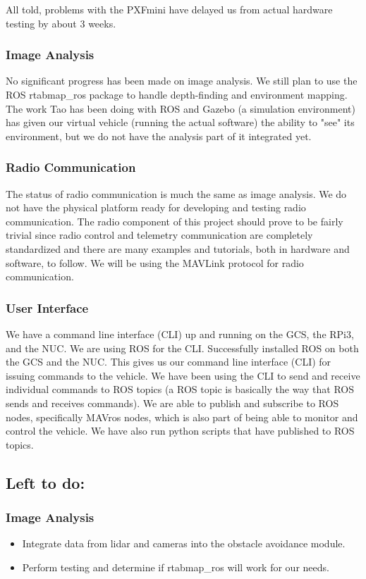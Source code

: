 \documentclass[compsoc,draftclsnofoot,onecolumn,10pt]{IEEEtran}
\begin{document}
All told, problems with the PXFmini have delayed us from actual hardware testing by about 3 weeks.

\subsubsection{Image Analysis}
No significant progress has been made on image analysis. We still plan to use the ROS rtabmap\_ros package to handle depth-finding and environment mapping. The work Tao has been doing with ROS and Gazebo (a simulation environment) has given our virtual vehicle (running the actual software) the ability to "see" its environment, but we do not have the analysis part of it integrated yet.


\subsubsection{Radio Communication}
The status of radio communication is much the same as image analysis. We do not have the physical platform ready for developing and testing radio communication. The radio component of this project should prove to be fairly trivial since radio control and telemetry communication are completely standardized and there are many examples and tutorials, both in hardware and software, to follow. We will be using the MAVLink protocol for radio communication.

\subsubsection{User Interface}
We have a command line interface (CLI) up and running on the GCS, the RPi3, and the NUC. We are using ROS for the CLI. 
Successfully installed ROS on both the GCS and the NUC. This gives us our command line interface (CLI) for issuing commands to the vehicle. We have been using the CLI to send and receive individual commands to ROS topics (a ROS topic is basically the way that ROS sends and receives commands). We are able to publish and subscribe to ROS nodes, specifically MAVros nodes, which is also part of being able to monitor and control the vehicle. We have also run python scripts that have published to ROS topics.


\subsection{Left to do:}
\subsubsection{Image Analysis}
\begin{itemize}
	\item Integrate data from lidar and cameras into the obstacle avoidance module.
	\item Perform testing and determine if rtabmap\_ros will work for our needs.
\end{itemize}
\end{document}
